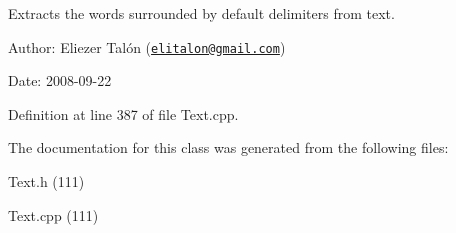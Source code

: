 Extracts the words surrounded by default delimiters from text. 

\begin{Desc}
\item[Author:]Eliezer Talón (\href{mailto:elitalon@gmail.com}{\tt elitalon@gmail.com}) \end{Desc}
\begin{Desc}
\item[Date:]2008-09-22 \end{Desc}


Definition at line 387 of file Text.cpp.

The documentation for this class was generated from the following files:\begin{CompactItemize}
\item 
Text.h (111)\item 
Text.cpp (111)\end{CompactItemize}
